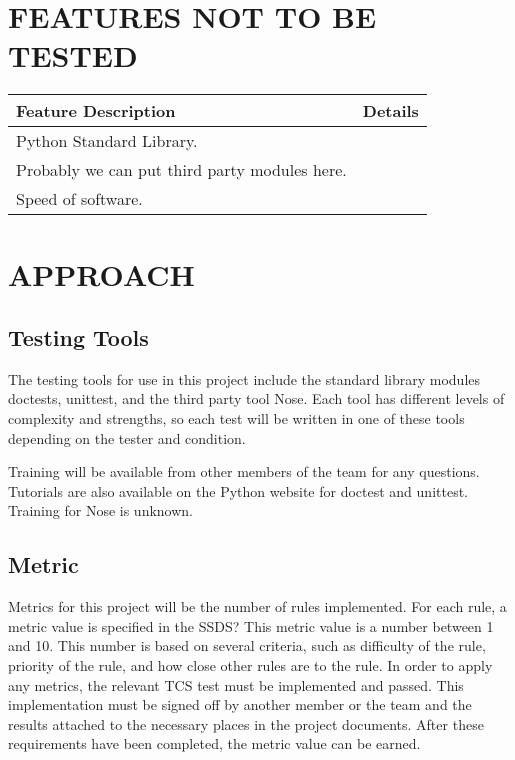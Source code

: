 \documentclass[report]{article}
\begin{document}
\section[FEATURES NOT TO BE TESTED]{FEATURES NOT TO BE TESTED}
\begin{center}
\begin{tabularx}{\textwidth}{| X | X |}
  \hline
  \textbf{Feature Description} &
    \textbf{Details} 
\\ \hline
 Python Standard Library.
 \\ \hline
 Probably we can put third party modules here.
 \\ \hline
 Speed of software.
\\ \hline
\end{tabularx}
\end{center}


\section[APPROACH]{APPROACH}
\subsection{Testing Tools}
The testing tools for use in this project include the standard library modules doctests, unittest, and the third party tool Nose. Each tool has different levels of complexity and strengths, so each test will be written in one of these tools depending on the tester and condition.

Training will be available from other members of the team for any questions. Tutorials are also available on the Python website for doctest and unittest. Training for Nose is unknown.

\subsection{Metric}
Metrics for this project will be the number of rules implemented. For each rule, a metric value is specified in the SSDS? This metric value is a number between 1 and 10. This number is based on several criteria, such as difficulty of the rule, priority of the rule, and how close other rules are to the rule. In order to apply any metrics, the relevant TCS test must be implemented and passed. This implementation must be signed off by another member or the team and the results attached to the necessary places in the project documents. After these requirements have been completed, the metric value can be earned.
\end{document}
